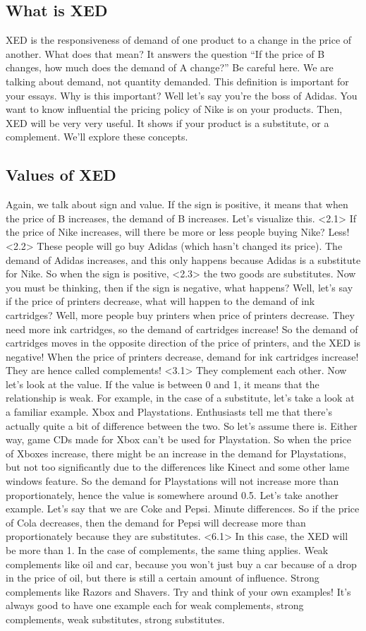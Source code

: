 \documentclass[DIV=classic,11pt,numbers=noenddot,listof=totoc,bibliography=totoc,parskip]{scrartcl}
\begin{document}
\subsection{What is XED}
XED is the responsiveness of demand of one product to a change in the price of another. What does that mean? It answers the question “If the price of B changes, how much does the demand of A change?” Be careful here. We are talking about demand, not quantity demanded. This definition is important for your essays. Why is this important? Well let’s say you’re the boss of Adidas. You want to know influential the pricing policy of Nike is on your products. Then, XED will be very very useful. It shows if your product is a substitute, or a complement. We’ll explore these concepts.
\subsection{Values of XED}
Again, we talk about sign and value. If the sign is positive, it means that when the price of B increases, the demand of B increases. Let’s visualize this. <2.1> If the price of Nike increases, will there be more or less people buying Nike? Less! <2.2> These people will go buy Adidas (which hasn’t changed its price). The demand of Adidas increases, and this only happens because Adidas is a substitute for Nike. So when the sign is positive, <2.3> the two goods are substitutes.  Now you must be thinking, then if the sign is negative, what happens? Well, let’s say if the price of printers decrease, what will happen to the demand of ink cartridges? Well, more people buy printers when price of printers decrease. They need more ink cartridges, so the demand of cartridges increase! So the demand of cartridges moves in the opposite direction of the price of printers, and the XED is negative! When the price of printers decrease, demand for ink cartridges increase! They are hence called complements! <3.1> They complement each other. 
Now let’s look at the value. If the value is between 0 and 1, it means that the relationship is weak. For example, in the case of a substitute, let’s take a look at a familiar example. Xbox and Playstations. Enthusiasts tell me that there’s actually quite a bit of difference between the two. So let’s assume there is. Either way, game CDs made for Xbox can’t be used for Playstation. So when the price of Xboxes increase, there might be an increase in the demand for Playstations, but not too significantly due to the differences like Kinect and some other lame windows feature. So the demand for Playstations will not increase more than proportionately, hence the value is somewhere around 0.5. Let’s take another example. Let’s say that we are Coke and Pepsi. Minute differences. So if the price of Cola decreases, then the demand for Pepsi will decrease more than proportionately because they are substitutes. <6.1> In this case, the XED will be more than 1. In the case of complements, the same thing applies. Weak complements like oil and car, because you won’t just buy a car because of a drop in the price of oil, but there is still a certain amount of influence. Strong complements like Razors and Shavers. Try and think of your own examples! It’s always good to have one example each for weak complements, strong complements, weak substitutes, strong substitutes.
\end{document}
